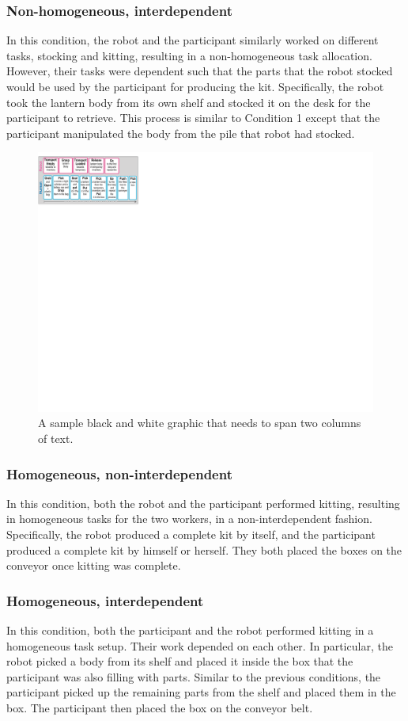 \subsubsection{Non-homogeneous, interdependent} In this condition, the robot and the participant similarly worked on different tasks, stocking and kitting, resulting in  a non-homogeneous task allocation. However, their tasks were dependent such that the parts that the robot stocked would be used by the participant for producing the kit. Specifically, the robot took the lantern body from its own shelf and stocked it on the desk for the participant to retrieve. This process is similar to Condition 1 except that the participant manipulated the body from the pile that robot had stocked.
\begin{figure}
\includegraphics{condition2}
\caption{A sample black and white graphic
that needs to span two columns of text.}
\end{figure}
\subsubsection{Homogeneous, non-interdependent} In this condition, both the robot and the participant performed kitting, resulting in homogeneous tasks for the two workers, in a non-interdependent fashion. Specifically, the robot produced a complete kit by itself, and the participant produced a complete kit by himself or herself. They both placed the boxes on the conveyor once kitting was complete.
\subsubsection{Homogeneous, interdependent} In this condition, both the participant and the robot performed kitting in a homogeneous task setup. Their work depended on each other. In particular, the robot picked a body from its shelf and placed it inside the box that the participant was also filling with parts. Similar to the previous conditions, the participant picked up the remaining parts from the shelf and placed them in the box. The participant then placed the box on the conveyor belt.
